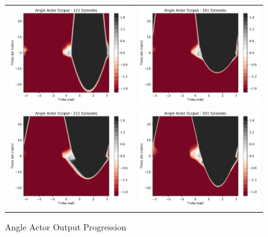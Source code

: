 \begin{figure}[H]
\begin{tabular}{cc}
		\includegraphics[width=65mm]{figures/train_figs/angle_actor/Actor0_121.pdf} &   \includegraphics[width=65mm]{figures/train_figs/angle_actor/Actor0_161.pdf} \\
		\includegraphics[width=65mm]{figures/train_figs/angle_actor/Actor0_221.pdf} &   \includegraphics[width=65mm]{figures/train_figs/angle_actor/Actor0_301.pdf} \\
	\end{tabular}
	\caption{Angle Actor Output Progression}\label{fig:angle_actor_contour}
\end{figure}
